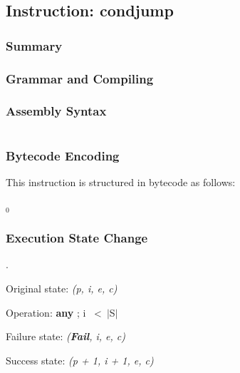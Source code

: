 \subsection{Instruction: condjump}

\subsubsection{Summary}

\subsubsection{Grammar and Compiling}

\subsubsection{Assembly Syntax}

\begin{myquote}
\begin{verbatim}

\end{verbatim}
\end{myquote}
\subsubsection{Bytecode Encoding}

This instruction is structured in bytecode as follows:

$_0$\ 

\subsubsection{Execution State Change}

.

Original state: \textit{(p, i, e, c)}

Operation: \textbf{any} ; i \ \textless \ $\vert$S$\vert$

Failure state: \textit{(\textbf{Fail}, i, e, c)}

Success state: \textit{(p + 1, i + 1, e, c)}

